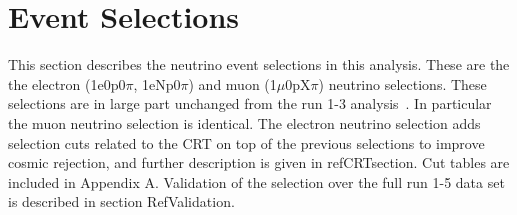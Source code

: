 \section{Event Selections}
\label{sec:EventSelections}



This section describes the neutrino event selections in this analysis. These are the the electron (1e0p0$\pi$, 1eNp0$\pi$) and muon (1$\mu$0pX$\pi$) neutrino selections.  These selections are in large part unchanged from the run 1-3 analysis~\cite{PELEEnote}.  In particular the muon neutrino selection is identical.  The electron neutrino selection adds selection cuts related to the CRT on top of the previous selections to improve cosmic rejection, and further description is given in refCRTsection. Cut tables are included in Appendix A.  Validation of the selection over the full run 1-5 data set is described in section RefValidation.  

